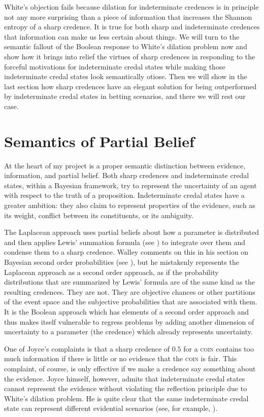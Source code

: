 White's objection fails because dilation for
indeterminate credences is in principle not any more
surprising than a piece of information that increases
the Shannon entropy of a sharp credence. It is true for
both sharp and indeterminate credences that information
can make us less certain about things. We will turn to
the semantic fallout of the Boolean response to White's
dilation problem now and show how it brings into relief
the virtues of sharp credences in responding to the
forceful motivations for indeterminate credal states
while making those indeterminate credal states look
semantically otiose. Then we will show in the last
section how sharp credences have an elegant solution
for being outperformed by indeterminate credal states
in betting scenarios, and there we will rest our case.

\section{Semantics of Partial Belief}
\label{SemanticsOfPartialBelief}

At the heart of my project is a proper semantic
distinction between evidence, information, and partial
belief. Both sharp credences and indeterminate credal
states, within a Bayesian framework, try to represent
the uncertainty of an agent with respect to the truth
of a proposition. Indeterminate credal states have a
greater ambition: they also claim to represent
properties of the evidence, such as its weight,
conflict between its constituents, or its ambiguity.

The Laplacean approach uses partial beliefs about how a
parameter is distributed and then applies Lewis'
summation formula (see ) to
integrate over them and condense them to a sharp
credence. Walley comments on this  in
his section on Bayesian second order probabilities (see
), but he mistakenly
represents the Laplacean approach as a second order
approach, as if the probability distributions that are
summarized by Lewis' formula are of the same kind as
the resulting credences. They are not. They are
objective chances or other partitions of the event
space and the subjective probabilities that are
associated with them. It is the Boolean approach which
has elements of a second order approach and thus makes
itself vulnerable to regress problems by adding another
dimension of uncertainty to a parameter (the credence)
which already represents uncertainty.

One of Joyce's complaints is that a sharp credence of
$0.5$ for a \textsc{coin} contains too much information
if there is little or no evidence that the
\textsc{coin} is fair. This complaint, of course, is
only effective if we make a credence say something
about the evidence. Joyce himself, however, admits that
indeterminate credal states cannot represent the
evidence without violating the reflection principle due
to White's dilation problem. He is quite clear that the
same indeterminate credal state can represent different
evidential scenarios (see, for example,
).

